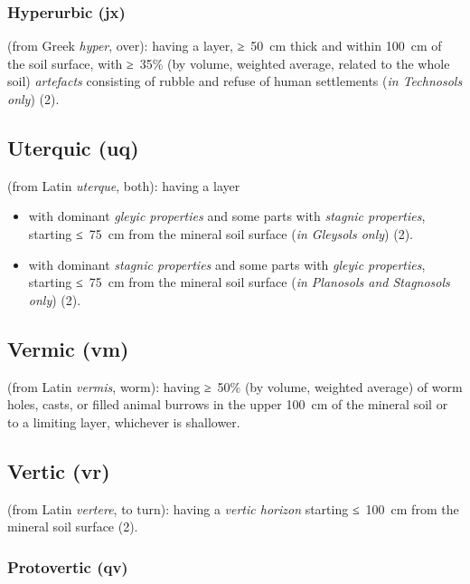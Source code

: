 \documentclass[
  letterpaper,
  DIV=11,
  numbers=noendperiod]{scrreprt}
\providecommand{\tightlist}{%
  \setlength{\itemsep}{0pt}\setlength{\parskip}{0pt}}\usepackage{longtable,booktabs,array}
\begin{document}
\hypertarget{hyperurbic-jx}{%
\subsubsection{Hyperurbic (jx)}\label{hyperurbic-jx}}

(from Greek \emph{hyper}, over): having a layer, ≥~50~cm thick and
within 100~cm of the soil surface, with ≥~35\% (by volume, weighted
average, related to the whole soil) \emph{artefacts} consisting of
rubble and refuse of human settlements (\emph{in Technosols only}) (2).

\hypertarget{uterquic-uq}{%
\subsection{Uterquic (uq)}\label{uterquic-uq}}

(from Latin \emph{uterque}, both): having a layer

\begin{itemize}
\tightlist
\item
  with dominant \emph{gleyic properties} and some parts with
  \emph{stagnic properties}, starting ≤~75~cm from the mineral soil
  surface (\emph{in Gleysols only}) (2).
\item
  with dominant \emph{stagnic properties} and some parts with
  \emph{gleyic properties}, starting ≤~75~cm from the mineral soil
  surface (\emph{in Planosols and Stagnosols only}) (2).
\end{itemize}

\hypertarget{vermic-vm}{%
\subsection{Vermic (vm)}\label{vermic-vm}}

(from Latin \emph{vermis}, worm): having ≥~50\% (by volume, weighted
average) of worm holes, casts, or filled animal burrows in the upper
100~cm of the mineral soil or to a limiting layer, whichever is
shallower.

\hypertarget{vertic-vr}{%
\subsection{Vertic (vr)}\label{vertic-vr}}

(from Latin \emph{vertere}, to turn): having a \emph{vertic horizon}
starting ≤~100~cm from the mineral soil surface (2).

\hypertarget{protovertic-qv-1}{%
\subsubsection{Protovertic (qv)}\label{protovertic-qv-1}}
\end{document}
